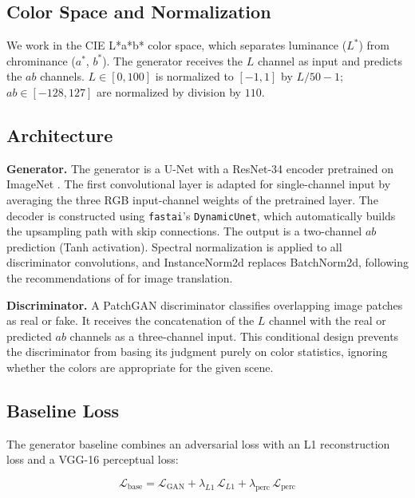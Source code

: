 \documentclass[conference]{IEEEtran}
\begin{document}
\subsection{Color Space and Normalization}

We work in the CIE L*a*b* color space, which separates luminance ($L^*$) from
chrominance ($a^*$, $b^*$). The generator receives the $L$ channel as input and
predicts the $ab$ channels. $L \in [0, 100]$ is normalized to $[-1, 1]$ by
$L/50 - 1$; $ab \in [-128, 127]$ are normalized by division by $110$.

\subsection{Architecture}

\textbf{Generator.} The generator is a U-Net with a ResNet-34 encoder pretrained
on ImageNet \cite{he2016deep, ronneberger2015u}. The first convolutional layer is
adapted for single-channel input by averaging the three RGB input-channel weights
of the pretrained layer. The decoder is constructed using \texttt{fastai}'s
\texttt{DynamicUnet}, which automatically builds the upsampling path with skip
connections. The output is a two-channel $ab$ prediction (Tanh activation).
Spectral normalization \cite{miyato2018spectral} is applied to all discriminator
convolutions, and InstanceNorm2d replaces BatchNorm2d, following the
recommendations of \cite{isola2017image} for image translation.

\textbf{Discriminator.} A PatchGAN discriminator \cite{isola2017image} classifies
overlapping image patches as real or fake. It receives the concatenation of the $L$
channel with the real or predicted $ab$ channels as a three-channel input. This
conditional design prevents the discriminator from basing its judgment purely on
color statistics, ignoring whether the colors are appropriate for the given scene.

\subsection{Baseline Loss}

The generator baseline combines an adversarial loss with an L1 reconstruction
loss and a VGG-16 perceptual loss:

\begin{equation}
    \mathcal{L}_{\text{base}} = \mathcal{L}_{\text{GAN}} + \lambda_{L1}\,\mathcal{L}_{L1}
    + \lambda_{\text{perc}}\,\mathcal{L}_{\text{perc}}
\end{equation}
\end{document}
